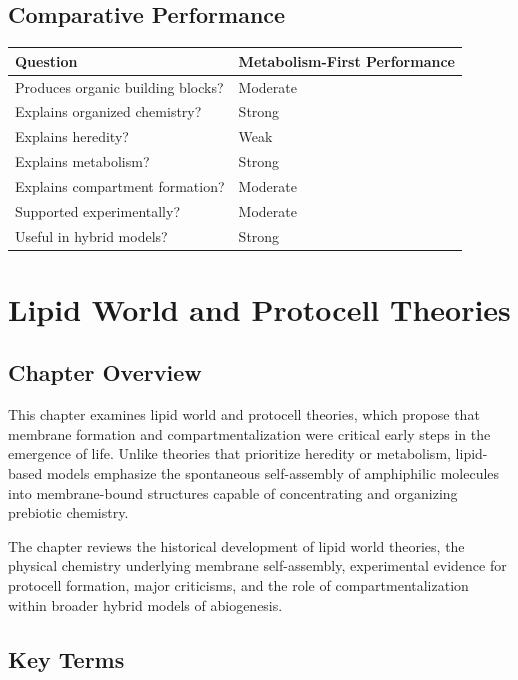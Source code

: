 \documentclass[
  oneside]{book}
\begin{document}
\section{Comparative Performance}\label{comparative-performance-2}

\begin{longtable}[]{@{}ll@{}}
\toprule\noalign{}
Question & Metabolism-First Performance \\
\midrule\noalign{}
\endhead
\bottomrule\noalign{}
\endlastfoot
Produces organic building blocks? & Moderate \\
Explains organized chemistry? & Strong \\
Explains heredity? & Weak \\
Explains metabolism? & Strong \\
Explains compartment formation? & Moderate \\
Supported experimentally? & Moderate \\
Useful in hybrid models? & Strong \\
\end{longtable}

\chapter{Lipid World and Protocell Theories}\label{lipid-world-and-protocell-theories}

\section{Chapter Overview}\label{chapter-overview-3}

This chapter examines lipid world and protocell theories, which propose that membrane formation and compartmentalization were critical early steps in the emergence of life. Unlike theories that prioritize heredity or metabolism, lipid-based models emphasize the spontaneous self-assembly of amphiphilic molecules into membrane-bound structures capable of concentrating and organizing prebiotic chemistry.

The chapter reviews the historical development of lipid world theories, the physical chemistry underlying membrane self-assembly, experimental evidence for protocell formation, major criticisms, and the role of compartmentalization within broader hybrid models of abiogenesis.

\section{Key Terms}\label{key-terms-3}
\end{document}
